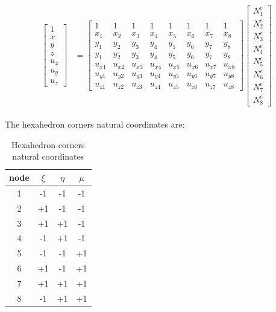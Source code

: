 \documentclass[10pt,b5paper,titlepage]{book}
\newenvironment{eqarray}
{
    \begin{eqnarray}
        \begin{aligned}
}
{
        \end{aligned}
    \end{eqnarray}
}
\begin{document}
\begin{eqarray}
    \begin{bmatrix}
        1\\
        x\\
        y\\
        z\\
        u_x\\
        u_y\\
        u_z
    \end{bmatrix} &=
    \begin{bmatrix}
        1 & 1 & 1 & 1 & 1 & 1 & 1 & 1\\
        x_1 & x_2 & x_3 & x_4 & x_5 & x_6 & x_7 & x_8\\
        y_1 & y_2 & y_3 & y_4 & y_5 & y_6 & y_7 & y_8\\
        y_1 & y_2 & y_3 & y_4 & y_5 & y_6 & y_7 & y_8\\
        u_{x1} & u_{x2} & u_{x3} & u_{x4} & u_{x5} & u_{x6} & u_{x7} & u_{x8}\\
        u_{y1} & u_{y2} & u_{y3} & u_{y4} & u_{y5} & u_{y6} & u_{y7} & u_{y8}\\
        u_{z1} & u_{z2} & u_{z3} & u_{z4} & u_{z5} & u_{z6} & u_{z7} & u_{z8}
    \end{bmatrix}
    \begin{bmatrix}
        N_1^e\\
        N_2^e\\
        N_3^e\\
        N_4^e\\
        N_5^e\\
        N_6^e\\
        N_7^e\\
        N_8^e
    \end{bmatrix}
\end{eqarray}

The hexahedron corners natural coordinates are:

\begin{table}[ht]
    \centering
    \begin{tabular}{|c c c c|}
        \hline
        node & $\xi$ & $\eta$ & $\mu$\\
        \hline
        1 & -1 & -1 & -1\\
        2 & +1 & -1 & -1\\
        3 & +1 & +1 & -1\\
        4 & -1 & +1 & -1\\
        5 & -1 & -1 & +1\\
        6 & +1 & -1 & +1\\
        7 & +1 & +1 & +1\\
        8 & -1 & +1 & +1\\
        \hline
    \end{tabular}\\
    \caption{Hexahedron corners natural coordinates}
\end{table}
\end{document}
